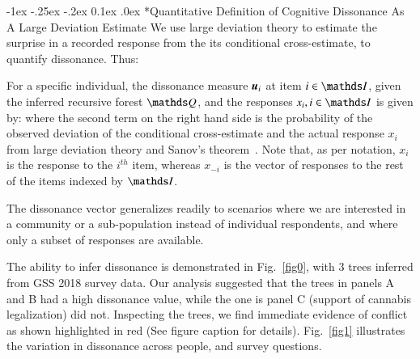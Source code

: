 \documentclass[onecolumn, compsoc,11pt]{IEEEtran}
\makeatletter
\renewcommand\subsection{\@startsection {section}{1}{\z@}%
                                   {-1ex \@plus -.25ex \@minus -.2ex}%
                                   {0.1ex \@plus.0ex}%
                                   {\fontsize{11}{10}\selectfont\bfseries\sffamily\color{DodgerBlue4}}}
\makeatother
\begin{document}
  \subsection*{Quantitative Definition of Cognitive Dissonance As A Large Deviation Estimate}
  We use large deviation theory to estimate the surprise in a recorded response from the
  its conditional cross-estimate, to quantify dissonance. Thus:
\begin{defn}
  For a specific individual, the dissonance measure $\boldsymbol{u}_i$ at item $i\in \I$, given  the inferred recursive forest $\Q$, and the responses $x_i, i \in \I$ is given by:
  where the second term on the right hand side is the probability  of the observed deviation of the conditional cross-estimate and the actual response $x_i$ from large deviation theory and Sanov's theorem~\cite{cover}. Note that, as per notation, $x_i$ is the response to the $i^{th}$ item, whereas $x_{-i}$ is the vector of responses to the rest of the items indexed by $\I$.
\end{defn}
The  dissonance vector generalizes readily to scenarios where we are interested in   a community or a sub-population instead of individual respondents, and where only a subset of responses are available.

The ability to  infer dissonance is demonstrated in Fig.~\ref{fig0}, with $3$ trees inferred from GSS 2018 survey data. Our analysis suggested that the trees in panels A and B had a high dissonance value, while the one is panel C (support of cannabis legalization) did not. Inspecting the trees, we find immediate evidence of conflict as shown highlighted in red (See figure caption for details). Fig.~\ref{fig1} illustrates the variation in dissonance across people, and survey questions.
%
\end{document}
